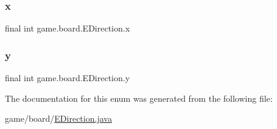 \subsubsection{\texorpdfstring{x}{x}}
{\footnotesize\ttfamily final int game.\+board.\+E\+Direction.\+x\hspace{0.3cm}{\ttfamily [private]}}

\mbox{\label{enumgame_1_1board_1_1_e_direction_a6f3fc300f2b86e553a066e9a5d85a2b0}} 
\subsubsection{\texorpdfstring{y}{y}}
{\footnotesize\ttfamily final int game.\+board.\+E\+Direction.\+y\hspace{0.3cm}{\ttfamily [private]}}



The documentation for this enum was generated from the following file\+:\begin{DoxyCompactItemize}
\item 
game/board/\mbox{\hyperlink{_e_direction_8java}{E\+Direction.\+java}}\end{DoxyCompactItemize}
